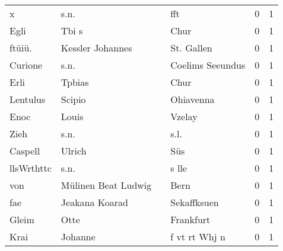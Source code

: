 \begin{center}
\begin{tiny}
\begin{longtabu}{llllrr}
                        x &                               s.n. &             &                                         fft &          0 &         1 \\
                     Egli &                              Tbi s &             &                                        Chur &          0 &         1 \\
                   ftüiü. &                   Kessler Johannes &             &                                  St. Gallen &          0 &         1 \\
                  Curione &                               s.n. &             &                            Coelims Seeundus &          0 &         1 \\
                     Erli &                             Tpbias &             &                                        Chur &          0 &         1 \\
                 Lentulus &                             Scipio &             &                                   Ohiavenna &          0 &         1 \\
                     Enoc &                              Louis &             &                                      Vzelay &          0 &         1 \\
                     Zieh &                               s.n. &             &                                        s.l. &          0 &         1 \\
                  Caspell &                             Ulrich &             &                                         Süs &          0 &         1 \\
               llsWrthttc &                               s.n. &             &                                       s lle &          0 &         1 \\
                      von &                Mülinen Beat Ludwig &             &                                        Bern &          0 &         1 \\
                      fae &                     Jeakana Koarad &             &                                 Sekaffksuen &          0 &         1 \\
                    Gleim &                               Otte &             &                                   Frankfurt &          0 &         1 \\
                     Krai &                            Johanne &             &                               f vt rt Whj n &          0 &         1 \\

\end{longtabu}
\end{tiny}
\end{center}
